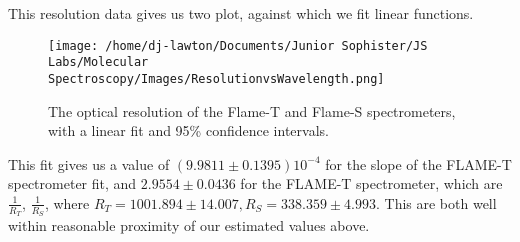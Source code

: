 \documentclass{article}
\begin{document}
This resolution data gives us two plot, against which we fit linear functions.
\begin{figure}[H]
    \centering
    \texttt{[image: /home/dj-lawton/Documents/Junior Sophister/JS Labs/Molecular Spectroscopy/Images/ResolutionvsWavelength.png]}
    \caption{\label{fig:Resolution} The optical resolution of the Flame-T and Flame-S spectrometers, with a linear fit and 95\% confidence intervals.}
\end{figure}
This fit gives us a value of $(9.9811\pm0.1395)10^{-4}$ for the slope of the FLAME-T spectrometer fit, and $2.9554\pm0.0436$ for the FLAME-T spectrometer, which are $\frac{1}{R_T}$, $\frac{1}{R_S}$, where $R_T = 1001.894\pm14.007, R_S = 338.359\pm4.993$. This are both well within reasonable proximity of our estimated values above.\\
\end{document}
